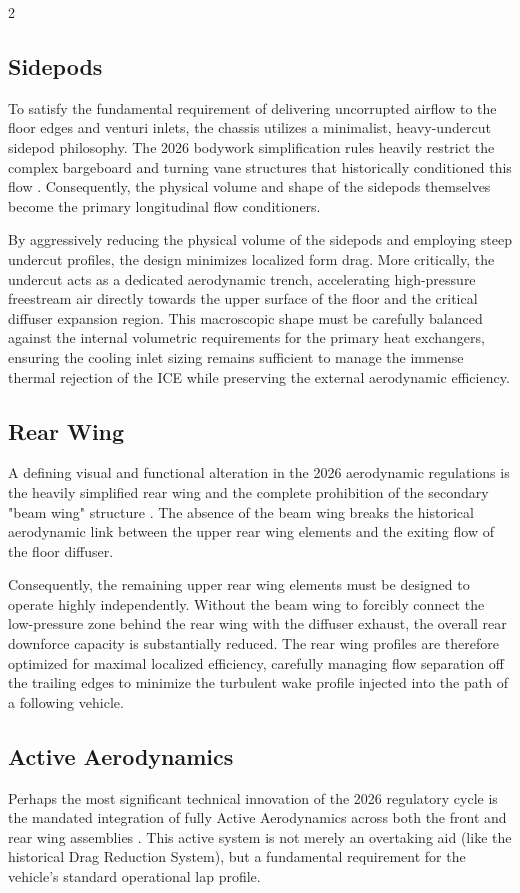 \begin{multicols}{2}
\subsection{Sidepods}
To satisfy the fundamental requirement of delivering uncorrupted airflow to the floor edges and venturi inlets, the chassis utilizes a minimalist, heavy-undercut sidepod philosophy. The 2026 bodywork simplification rules heavily restrict the complex bargeboard and turning vane structures that historically conditioned this flow \cite{FIA_2026_Chassis_Regulations}. Consequently, the physical volume and shape of the sidepods themselves become the primary longitudinal flow conditioners.

By aggressively reducing the physical volume of the sidepods and employing steep undercut profiles, the design minimizes localized form drag. More critically, the undercut acts as a dedicated aerodynamic trench, accelerating high-pressure freestream air directly towards the upper surface of the floor and the critical diffuser expansion region. This macroscopic shape must be carefully balanced against the internal volumetric requirements for the primary heat exchangers, ensuring the cooling inlet sizing remains sufficient to manage the immense thermal rejection of the ICE while preserving the external aerodynamic efficiency.

\subsection{Rear Wing}
A defining visual and functional alteration in the 2026 aerodynamic regulations is the heavily simplified rear wing and the complete prohibition of the secondary "beam wing" structure \cite{FIA_2026_Technical_Regulations}. The absence of the beam wing breaks the historical aerodynamic link between the upper rear wing elements and the exiting flow of the floor diffuser.

Consequently, the remaining upper rear wing elements must be designed to operate highly independently. Without the beam wing to forcibly connect the low-pressure zone behind the rear wing with the diffuser exhaust, the overall rear downforce capacity is substantially reduced. The rear wing profiles are therefore optimized for maximal localized efficiency, carefully managing flow separation off the trailing edges to minimize the turbulent wake profile injected into the path of a following vehicle.

\subsection{Active Aerodynamics}
Perhaps the most significant technical innovation of the 2026 regulatory cycle is the mandated integration of fully Active Aerodynamics across both the front and rear wing assemblies \cite{FIA_2026_Chassis_Regulations}. This active system is not merely an overtaking aid (like the historical Drag Reduction System), but a fundamental requirement for the vehicle's standard operational lap profile.


\end{multicols}
